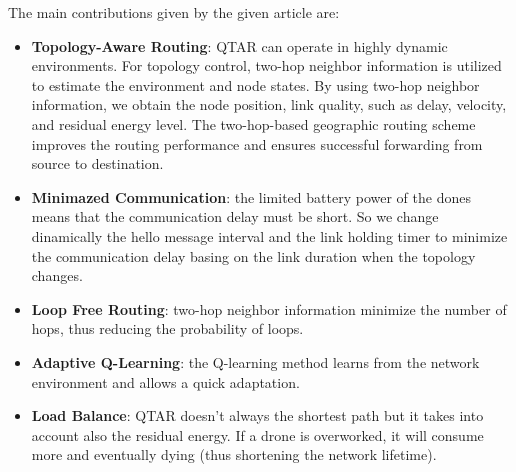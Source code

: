 The main contributions given by the given article are:
\begin{itemize}
    \item \textbf{Topology-Aware Routing}: QTAR can operate in highly dynamic environments. For
    topology control, two-hop neighbor information is utilized to estimate the environment and node states. By
    using two-hop neighbor information, we obtain the node
    position, link quality, such as delay, velocity, and residual energy level. The two-hop-based geographic routing
    scheme improves the routing performance and ensures
    successful forwarding from source to destination.
    \item \textbf{Minimazed Communication}: the limited battery power of the dones means that the communication delay must be short. So we change dinamically the hello message interval and the link holding timer to minimize the communication delay basing on the link duration when the topology changes.
    \item \textbf{Loop Free Routing}: two-hop neighbor information minimize the number of hops, thus reducing the probability of loops.
    \item \textbf{Adaptive Q-Learning}: the Q-learning method learns from
    the network environment and allows a quick adaptation.
    \item \textbf{Load Balance}: QTAR doesn't always the shortest path but it takes into account also the residual energy. If a drone is overworked, it will consume more and eventually dying (thus shortening the network lifetime).
\end{itemize}